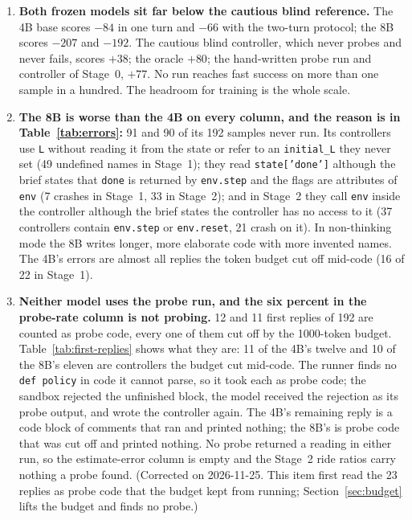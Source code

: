 \documentclass[11pt,a4paper]{article}
\begin{document}
\begin{enumerate}[leftmargin=1.5em]
  \item \textbf{Both frozen models sit far below the cautious blind
  reference.} The 4B base scores $-84$ in one turn and $-66$ with the
  two-turn protocol; the 8B scores $-207$ and $-192$. The cautious blind
  controller, which never probes and never fails, scores $+38$; the oracle
  $+80$; the hand-written probe run and controller of Stage~0, $+77$. No run
  reaches fast success on more than one sample in a hundred. The headroom for
  training is the whole scale.

  \item \textbf{The 8B is worse than the 4B on every column, and the reason
  is in Table~\ref{tab:errors}:} 91 and 90 of its 192 samples never run. Its
  controllers use \texttt{L} without reading it from the state or refer to an
  \texttt{initial\_L} they never set (49 undefined names in Stage~1); they
  read \texttt{state['done']} although the brief states that \texttt{done} is
  returned by \texttt{env.step} and the flags are attributes of \texttt{env}
  (7 crashes in Stage~1, 33 in Stage~2); and in Stage~2 they call \texttt{env}
  inside the controller although the brief states the controller has no
  access to it (37 controllers contain \texttt{env.step} or
  \texttt{env.reset}, 21 crash on it). In non-thinking mode the 8B writes
  longer, more elaborate code with more invented names. The 4B's errors are
  almost all replies the token budget cut off mid-code (16 of 22 in Stage~1).

  \item \textbf{Neither model uses the probe run, and the six percent in the
  probe-rate column is not probing.} 12 and 11 first replies of 192 are
  counted as probe code, every one of them cut off by the 1000-token budget.
  Table~\ref{tab:first-replies} shows what they are: 11 of the 4B's twelve and
  10 of the 8B's eleven are controllers the budget cut mid-code. The runner
  finds no \texttt{def policy} in code it cannot parse, so it took each as
  probe code; the sandbox rejected the unfinished block, the model received
  the rejection as its probe output, and wrote the controller again. The 4B's
  remaining reply is a code block of comments that ran and printed nothing;
  the 8B's is probe code that was cut off and printed nothing. No probe
  returned a reading in either run, so the estimate-error column is empty and
  the Stage~2 ride ratios carry nothing a probe found. (Corrected on
  2026-11-25. This item first read the 23 replies as probe code that the
  budget kept from running; Section~\ref{sec:budget} lifts the budget and
  finds no probe.)


\end{enumerate}
\end{document}
